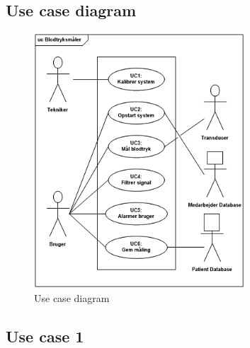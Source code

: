 \subsection{Use case diagram}
\begin{figure}[H]
	\centering
	\includegraphics[width=0.7\textwidth]{Figurer/ISE/UcDiagram2}
	\caption{Use case diagram}
	\label{UC diagram}
\end{figure}

\subsection{Use case 1}

